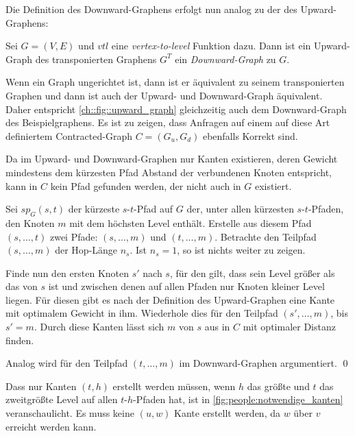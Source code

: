 Die Definition des Downward-Graphens erfolgt nun analog zu der des Upward-Graphens:

\begin{definition}
  Sei $G = (V, E)$ und ${vtl}$ eine \emph{vertex-to-level} Funktion dazu. Dann ist ein Upward-Graph des transponierten Graphens $G^T$ ein \emph{Downward-Graph} zu $G$.
\end{definition}

Wenn ein Graph ungerichtet ist, dann ist er äquivalent zu seinem transponierten Graphen und dann ist auch der Upward- und Downward-Graph äquivalent.
Daher entspricht \autoref{ch::fig::upward_graph} gleichzeitig auch dem Downward-Graph des Beispielgraphens.
Es ist zu zeigen, dass Anfragen auf einem auf diese Art definiertem Contracted-Graph $C = (G_u, G_d)$ ebenfalls Korrekt sind.

\begin{beweis}
  Da im Upward- und Downward-Graphen nur Kanten existieren, deren Gewicht mindestens dem kürzesten Pfad Abstand der verbundenen Knoten entspricht, kann in $C$ kein Pfad gefunden werden, der nicht auch in $G$ existiert.

  Sei ${sp}_G(s, t)$ der kürzeste $s$-$t$-Pfad auf $G$ der, unter allen kürzesten $s$-$t$-Pfaden, den Knoten $m$ mit dem höchsten Level enthält.
  Erstelle aus diesem Pfad $(s, \dotsc, t)$ zwei Pfade: $(s, \dotsc, m)$ und $(t, \dotsc, m)$.
  Betrachte den Teilpfad $(s, \dotsc, m)$ der Hop-Länge $n_s$.
  Ist $n_s = 1$, so ist nichts weiter zu zeigen.

  Finde nun den ersten Knoten $s'$ nach $s$, für den gilt, dass sein Level größer als das von $s$ ist und zwischen denen auf allen Pfaden nur Knoten kleiner Level liegen.
  Für diesen gibt es nach der Definition des Upward-Graphen eine Kante mit optimalem Gewicht in ihm.
  Wiederhole dies für den Teilpfad $(s', \dotsc, m)$, bis $s' = m$.
  Durch diese Kanten lässt sich $m$ von $s$ aus in $C$ mit optimaler Distanz finden.

  Analog wird für den Teilpfad $(t, \dotsc, m)$ im Downward-Graphen argumentiert.
  \qed
\end{beweis}

Dass nur Kanten $(t, h)$ erstellt werden müssen, wenn $h$ das größte und $t$ das zweitgrößte Level auf allen $t$-$h$-Pfaden hat, ist in \autoref{fig:people:notwendige_kanten} veranschaulicht.
Es muss keine $(u, w)$ Kante erstellt werden, da $w$ über $v$ erreicht werden kann.

